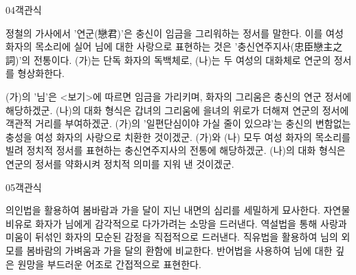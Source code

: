 \documentclass[fs85,seriesWit]{korfarm-base}
\begin{document}
\begin{kfQBlock}{04}{객관식}
\begin{kfEvidence}정철의 가사에서 '연군(戀君)'은 충신이 임금을 그리워하는 정서를 말한다. 이를 여성 화자의 목소리에 실어 님에 대한 사랑으로 표현하는 것은 '충신연주지사(忠臣戀主之詞)'의 전통이다. (가)는 단독 화자의 독백체로, (나)는 두 여성의 대화체로 연군의 정서를 형상화한다.\end{kfEvidence}
\begin{kfChoices}
\kfChoice (가)의 '님'은 <보기>에 따르면 임금을 가리키며, 화자의 그리움은 충신의 연군 정서에 해당하겠군.
\kfChoice (나)의 대화 형식은 갑녀의 그리움에 을녀의 위로가 더해져 연군의 정서에 객관적 거리를 부여하겠군.
\kfChoice (가)의 '일편단심이야 가실 줄이 있으랴'는 충신의 변함없는 충성을 여성 화자의 사랑으로 치환한 것이겠군.
\kfChoice (가)와 (나) 모두 여성 화자의 목소리를 빌려 정치적 정서를 표현하는 충신연주지사의 전통에 해당하겠군.
\kfChoice (나)의 대화 형식은 연군의 정서를 약화시켜 정치적 의미를 지워 낸 것이겠군.
\end{kfChoices}
\end{kfQBlock}

\begin{kfQBlock}{05}{객관식}
\begin{kfChoices}
\kfChoice 의인법을 활용하여 봄바람과 가을 달이 지닌 내면의 심리를 세밀하게 묘사한다.
\kfChoice 자연물 비유로 화자가 님에게 감각적으로 다가가려는 소망을 드러낸다.
\kfChoice 역설법을 통해 사랑과 미움이 뒤섞인 화자의 모순된 감정을 직접적으로 드러낸다.
\kfChoice 직유법을 활용하여 님의 외모를 봄바람의 가벼움과 가을 달의 환함에 비교한다.
\kfChoice 반어법을 사용하여 님에 대한 깊은 원망을 부드러운 어조로 간접적으로 표현한다.
\end{kfChoices}
\end{kfQBlock}

\kfEndMC
\end{document}
